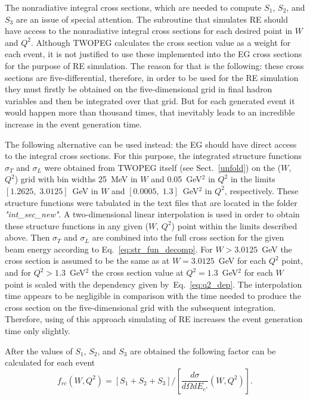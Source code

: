 The nonradiative integral cross sections, which are needed to compute $S_1$, $S_2$, and $S_3$ are an issue of special attention. The subroutine that simulates RE should have access to the nonradiative integral cross sections for each desired point in $W$ and $Q^2$. Although TWOPEG calculates the cross section value as a weight for each event, it is not justified to use these implemented into the EG cross sections for the purpose of RE simulation. The reason for that is the following: these cross sections are five-differential, therefore, in order to be used for the RE simulation they must firstly be obtained on the five-dimensional grid in final hadron variables and then be integrated over that grid. But for each generated event it would happen more than thousand times, that inevitably leads to an incredible increase in the event generation time.

The following alternative can be used instead: the EG should have direct access to the integral cross sections.
For this purpose, the integrated structure functions $\sigma_{T}$ and $\sigma_{L}$ were obtained from TWOPEG itself (see Sect.~\ref{unfold})  
 on the ($W$,~$Q^2$) grid with bin widths 25~MeV in $W$ and 0.05~GeV$^2$ in $Q^2$ in the limits $[1.2625,\;3.0125]$~GeV in $W$ and $[0.0005,\;1.3]$~GeV$^2$ in $Q^2$, respectively. These structure functions were tabulated in the text files that are located in the folder {\em "int\_sec\_new"}. A two-dimensional linear interpolation is used in order to obtain these structure functions in any given ($W$, $Q^2$) point within the limits described above. Then $\sigma_{T}$ and $\sigma_{L}$ are combined into the full cross section for the given beam energy according to Eq.~\eqref{eq:str_fun_decomp}.
For $W > 3.0125$~GeV the cross section is assumed to be the same as at $W = 3.0125$~GeV for each $Q^2$ point, and for $Q^2 > 1.3$~GeV$^2$ the cross section value at $Q^2 = 1.3$~GeV$^2$ for each $W$ point is scaled with the dependency given by~Eq.~\eqref{eq:q2_dep}.  The interpolation time appears to be negligible in comparison with the time needed to produce the cross section on the five-dimensional grid with the subsequent integration. Therefore, using of this approach simulating of RE increases the event generation time only slightly. 

After the values of $S_1$, $S_2$, and $S_3$ are obtained the following factor can be calculated for each event 
\begin{equation}
f_{rc} (W,Q^2) = \left [S_1+S_2+S_3\right ]/\left [\frac{d\sigma}{d\Omega dE_{e'}}(W,Q^2)\right ].
\end{equation}

